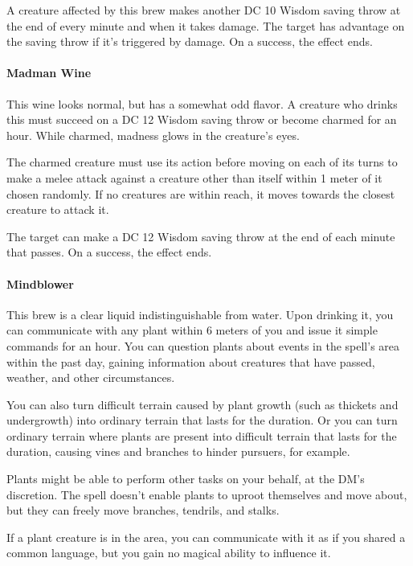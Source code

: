         A creature affected by this brew makes another DC 10 Wisdom saving throw at the end of every minute and when it takes damage.
        The target has advantage on the saving throw if it's triggered by damage.
        On a success, the effect ends.
    \paragraph{Madman Wine} %
        This wine looks normal, but has a somewhat odd flavor.
        A creature who drinks this must succeed on a DC 12 Wisdom saving throw or become charmed for an hour.
        While charmed, madness glows in the creature's eyes.

        The charmed creature must use its action before moving on each of its turns to make a melee attack against a creature other than itself within 1 meter of it chosen randomly.
        If no creatures are within reach, it moves towards the closest creature to attack it.

        The target can make a DC 12 Wisdom saving throw at the end of each minute that passes.
        On a success, the effect ends.
    \paragraph{Mindblower} %
        This brew is a clear liquid indistinguishable from water.
        Upon drinking it, you can communicate with any plant within 6 meters of you and issue it simple commands for an hour.
        You can question plants about events in the spell's area within the past day, gaining information about creatures that have passed, weather, and other circumstances.

        You can also turn difficult terrain caused by plant growth (such as thickets and undergrowth) into ordinary terrain that lasts for the duration.
        Or you can turn ordinary terrain where plants are present into difficult terrain that lasts for the duration, causing vines and branches to hinder pursuers, for example.

        Plants might be able to perform other tasks on your behalf, at the DM's discretion. The spell doesn't enable plants to uproot themselves and move about, but they can freely move branches, tendrils, and stalks.

        If a plant creature is in the area, you can communicate with it as if you shared a common language, but you gain no magical ability to influence it.


